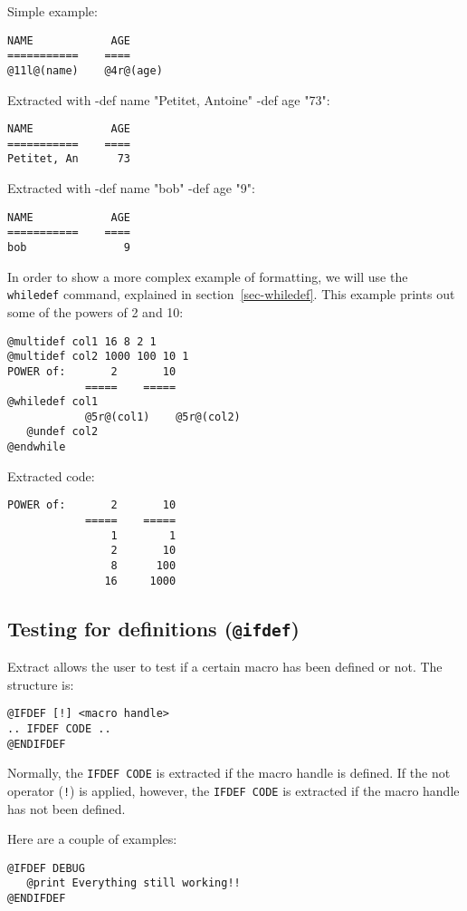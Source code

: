 \noindent
Simple example:
\begin{verbatim}
NAME            AGE
===========    ====
@11l@(name)    @4r@(age)
\end{verbatim}

\noindent
Extracted with {-def name "Petitet, Antoine" -def age "73"}:
\begin{verbatim}
NAME            AGE
===========    ====
Petitet, An      73
\end{verbatim}
\noindent
Extracted with {-def name "bob" -def age "9"}:
\begin{verbatim}
NAME            AGE
===========    ====
bob               9
\end{verbatim}

In order to show a more complex example of formatting, we will use the
{\tt whiledef} command, explained in section~\ref{sec-whiledef}.  This
example prints out some of the powers of 2 and 10:
\begin{verbatim}
@multidef col1 16 8 2 1
@multidef col2 1000 100 10 1
POWER of:       2       10
            =====    =====
@whiledef col1
            @5r@(col1)    @5r@(col2)
   @undef col2
@endwhile
\end{verbatim}
Extracted code:
\begin{verbatim}
POWER of:       2       10
            =====    =====
                1        1
                2       10
                8      100
               16     1000
\end{verbatim}

\subsection{Testing for definitions ({\tt @ifdef})}
Extract allows the user to test if a certain macro has been defined or not.
The structure is:

\begin{verbatim}
@IFDEF [!] <macro handle>
.. IFDEF CODE ..
@ENDIFDEF
\end{verbatim}

Normally, the {\tt IFDEF CODE} is extracted if the macro handle is defined.
If the not operator (\verb+!+) is applied, however, the {\tt IFDEF CODE}
is extracted if the macro handle has not been defined.

\noindent
Here are a couple of examples:
\begin{verbatim}
@IFDEF DEBUG
   @print Everything still working!!
@ENDIFDEF
\end{verbatim}

